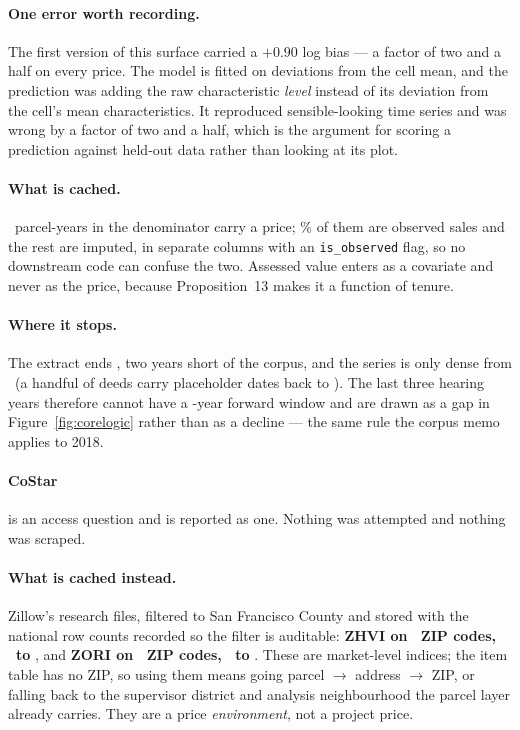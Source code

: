 \documentclass[11pt]{article}
\begin{document}
\paragraph{One error worth recording.} The first version of this surface carried a $+0.90$ log
bias --- a factor of two and a half on every price. The model is fitted on deviations from the
cell mean, and the prediction was adding the raw characteristic \emph{level} instead of its
deviation from the cell's mean characteristics. It reproduced sensible-looking time series and
was wrong by a factor of two and a half, which is the argument for scoring a prediction against
held-out data rather than looking at its plot.

\paragraph{What is cached.} \acqPricePanel\ parcel-years in the denominator carry a price;
\acqPriceObserved\% of them are observed sales and the rest are imputed, in separate columns
with an \texttt{is\_observed} flag, so no downstream code can confuse the two. Assessed value
enters as a covariate and never as the price, because Proposition~13 makes it a function of
tenure.

\paragraph{Where it stops.} The extract ends \acqClMaxDate, two years short of the corpus,
and the series is only dense from \acqClDenseFirst\ (a handful of deeds carry placeholder
dates back to \acqClFirst). The last three hearing years therefore cannot have a
\acqClWindowYears-year forward window and are drawn as a gap in Figure~\ref{fig:corelogic}
rather than as a decline --- the same rule the corpus memo applies to 2018.

\paragraph{CoStar} is an access question and is reported as one. Nothing was attempted and
nothing was scraped.

\paragraph{What is cached instead.} Zillow's research files, filtered to San Francisco County
and stored with the national row counts recorded so the filter is auditable:
\textbf{ZHVI on \acqZhviZips\ ZIP codes, \acqZhviFirst\ to \acqZhviLast}, and
\textbf{ZORI on \acqZoriZips\ ZIP codes, \acqZoriFirst\ to \acqZoriLast}. These are
market-level indices; the item table has no ZIP, so using them means going parcel $\to$
address $\to$ ZIP, or falling back to the supervisor district and analysis neighbourhood the
parcel layer already carries. They are a price \emph{environment}, not a project price.
\end{document}
